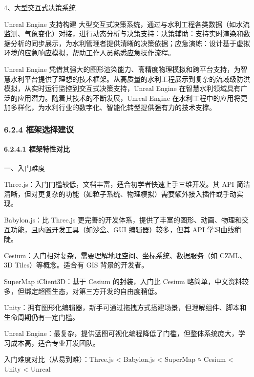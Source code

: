 4、大型交互式决策系统

Unreal Engine 支持构建 大型交互式决策系统，通过与水利工程各类数据（如水流监测、气象变化）对接，进行动态分析与决策支持：决策辅助：支持实时渲染和数据分析的同步展示，为水利管理者提供清晰的决策依据；应急演练：设计基于虚拟环境的应急响应模拟，帮助工作人员熟悉应急操作流程。

Unreal Engine 凭借其强大的图形渲染能力、高精度物理模拟和跨平台支持，为智慧水利平台提供了理想的技术框架。从高质量的水利工程展示到复杂的流域级防洪模拟，从实时运行监控到交互式决策支持，Unreal Engine 在智慧水利领域具有广泛的应用潜力。随着其技术的不断发展，Unreal Engine 在水利工程中的应用将更加多样化，为水利行业的数字化、智能化转型提供强有力的技术支撑。

\hypertarget{ux6846ux67b6ux9009ux62e9ux5efaux8bae}{%
\subsubsection{6.2.4 框架选择建议}\label{ux6846ux67b6ux9009ux62e9ux5efaux8bae}}

\hypertarget{ux6846ux67b6ux7279ux6027ux5bf9ux6bd4}{%
\paragraph{6.2.4.1 框架特性对比}\label{ux6846ux67b6ux7279ux6027ux5bf9ux6bd4}}

一、入门难度

Three.js：入门门槛较低，文档丰富，适合初学者快速上手三维开发。其 API 简洁清晰，但对更复杂的功能（如粒子系统、物理模拟）需要额外接入插件或手动实现。

Babylon.js：比 Three.js 更完善的开发体系，提供了丰富的图形、动画、物理和交互功能，且内置开发工具（如沙盒、GUI 编辑器）较多，但其 API 学习曲线稍陡。

Cesium：入门相对复杂，需要理解地理空间、坐标系统、数据服务（如 CZML、3D Tiles）等概念。适合有 GIS 背景的开发者。

SuperMap iClient3D：基于 Cesium 的封装，入门比 Cesium 略简单，中文资料较多，但绑定超图生态，对第三方开发的自由度稍低。

Unity：拥有图形化编辑器，新手可通过拖拽方式搭建场景，但理解组件、脚本和生命周期仍有一定门槛。

Unreal Engine：最复杂，提供蓝图可视化编程降低了门槛，但整体系统庞大，学习成本高，适合专业开发团队。

入门难度对比（从易到难）：Three.js \textless{} Babylon.js \textless{} SuperMap ≈ Cesium \textless{} Unity \textless{} Unreal

